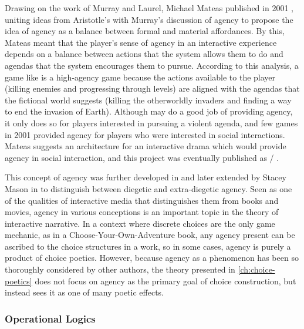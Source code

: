 Drawing on the work of Murray and Laurel, Michael Mateas published  in 2001 \citep{Mateas2001}, uniting ideas from Aristotle's  with Murray's discussion of agency to propose the idea of agency as a balance between formal and material affordances.
%
By this, Mateas meant that the player's sense of agency in an interactive experience depends on a balance between actions that the system allows them to do and agendas that the system encourages them to pursue.
%
According to this analysis, a game like  \citep{Quake} is a high-agency game because the actions available to the player (killing enemies and progressing through levels) are aligned with the agendas that the fictional world suggests (killing the otherworldly invaders and finding a way to end the invasion of Earth).
%
Although  may do a good job of providing agency, it only does so for players interested in pursuing a violent agenda, and few games in 2001 provided agency for players who were interested in social interactions.
%
Mateas suggests an architecture for an interactive drama which would provide agency in social interaction, and this project was eventually published as \facade/ \citep{Mateas2002b}.


This concept of agency was further developed in \citep{WardripFruin2009} and later extended by Stacey Mason in \citep{Mason2013} to distinguish between diegetic and extra-diegetic agency.
%
Seen as one of the qualities of interactive media that distinguishes them from books and movies, agency in various conceptions is an important topic in the theory of interactive narrative.
%
In a context where discrete choices are the only game mechanic, as in a Choose-Your-Own-Adventure book, any agency present can be ascribed to the choice structures in a work, so in some cases, agency is purely a product of choice poetics.
%
However, because agency as a phenomenon has been so thoroughly considered by other authors, the theory presented in \cref{ch:choice-poetics} does not focus on agency as the primary goal of choice construction, but instead sees it as one of many poetic effects.


\subsubsection{Operational Logics}

